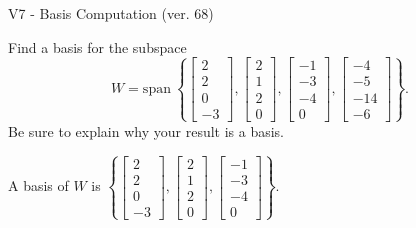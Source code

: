 \begin{exercise}
  \begin{exerciseTitle}V7 - Basis Computation (ver. 68)\end{exerciseTitle}
  \begin{exerciseStatement}
    Find a basis for the subspace 
\[W=\mathrm{span}\ \left\{\left[\begin{array}{r}
2 \\
2 \\
0 \\
-3
\end{array}\right] , \left[\begin{array}{r}
2 \\
1 \\
2 \\
0
\end{array}\right] , \left[\begin{array}{r}
-1 \\
-3 \\
-4 \\
0
\end{array}\right] , \left[\begin{array}{r}
-4 \\
-5 \\
-14 \\
-6
\end{array}\right]\right\}.\]
 Be sure to explain why your result is a basis.


  \end{exerciseStatement}
  \begin{exerciseAnswer}
   A basis of \(W\) is  \(\left\{\left[\begin{array}{r}
2 \\
2 \\
0 \\
-3
\end{array}\right] , \left[\begin{array}{r}
2 \\
1 \\
2 \\
0
\end{array}\right] , \left[\begin{array}{r}
-1 \\
-3 \\
-4 \\
0
\end{array}\right]\right\}\).
  


  \end{exerciseAnswer}
\end{exercise}